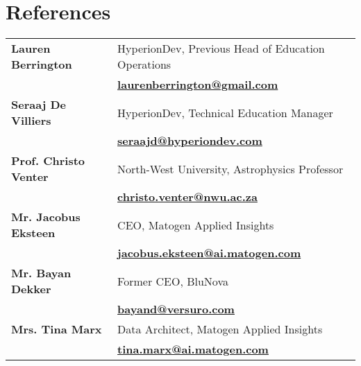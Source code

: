 \documentclass[a4paper,10pt]{article}
\begin{document}
\section*{References}
	\begin{tabularx}{\textwidth}{l X}
	\textbf{Lauren Berrington} & HyperionDev, Previous Head of Education Operations \\
	& \faEnvelope \quad \href{mailto:laurenberrington@gmail.com}{\textbf{laurenberrington@gmail.com}} \\[0.1cm]
		
	\textbf{Seraaj De Villiers} & HyperionDev, Technical Education Manager \\
	& \faEnvelope \quad \href{mailto:seraajd@hyperiondev.com}{\textbf{seraajd@hyperiondev.com}} \\[0.1cm]
	
	\textbf{Prof. Christo Venter} & North-West University, Astrophysics Professor \\
	& \faEnvelope \quad \href{mailto:christo.venter@nwu.ac.za}{\textbf{christo.venter@nwu.ac.za}} \\[0.1cm]
	
	\textbf{Mr. Jacobus Eksteen} & CEO, Matogen Applied Insights \\
	& \faEnvelope \quad \href{mailto:jacobus.eksteen@ai.matogen.com}{\textbf{jacobus.eksteen@ai.matogen.com}} \\[0.1cm]
	
	\textbf{Mr. Bayan Dekker} & Former CEO, BluNova\\
	& \faEnvelope \quad \href{mailto:bayand@versuro.com}{\textbf{bayand@versuro.com}} \\[0.1cm]
	
	\textbf{Mrs. Tina Marx} & Data Architect, Matogen Applied Insights\\
	& \faEnvelope \quad \href{mailto:tina.marx@ai.matogen.com}{\textbf{tina.marx@ai.matogen.com}} \\[0.1cm]
\end{tabularx}
	
\end{document}

